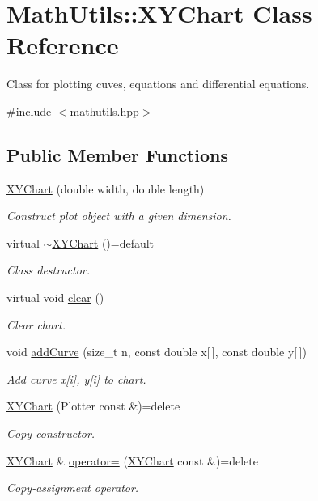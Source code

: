 \hypertarget{classMathUtils_1_1XYChart}{\section{Math\-Utils\-:\-:X\-Y\-Chart Class Reference}
\label{classMathUtils_1_1XYChart}
}


Class for plotting cuves, equations and differential equations.  




{\ttfamily \#include $<$mathutils.\-hpp$>$}

\subsection*{Public Member Functions}
\begin{DoxyCompactItemize}
\item 
\hyperlink{classMathUtils_1_1XYChart_a0ded76c4c566fe0225c58eebf9e012a5}{X\-Y\-Chart} (double width, double length)
\begin{DoxyCompactList}\small\item\em Construct plot object with a given dimension. \end{DoxyCompactList}\item 
virtual \hyperlink{classMathUtils_1_1XYChart_a251e5cd579d0d47948f1d4f76c7e2dd8}{$\sim$\-X\-Y\-Chart} ()=default
\begin{DoxyCompactList}\small\item\em Class destructor. \end{DoxyCompactList}\item 
virtual void \hyperlink{classMathUtils_1_1XYChart_a625ee682427abc4125d2bfa0c0a6f0f0}{clear} ()
\begin{DoxyCompactList}\small\item\em Clear chart. \end{DoxyCompactList}\item 
void \hyperlink{classMathUtils_1_1XYChart_abb639d16a75e6375580e69ccccc2f5ef}{add\-Curve} (size\-\_\-t n, const double x\mbox{[}$\,$\mbox{]}, const double y\mbox{[}$\,$\mbox{]})
\begin{DoxyCompactList}\small\item\em Add curve x\mbox{[}i\mbox{]}, y\mbox{[}i\mbox{]} to chart. \end{DoxyCompactList}\item 
\hyperlink{classMathUtils_1_1XYChart_abe905a2e1909bbe15ded217e73990fb5}{X\-Y\-Chart} (Plotter const \&)=delete
\begin{DoxyCompactList}\small\item\em Copy constructor. \end{DoxyCompactList}\item 
\hyperlink{classMathUtils_1_1XYChart}{X\-Y\-Chart} \& \hyperlink{classMathUtils_1_1XYChart_ae54518383fe46290828165a1f5780f9e}{operator=} (\hyperlink{classMathUtils_1_1XYChart}{X\-Y\-Chart} const \&)=delete
\begin{DoxyCompactList}\small\item\em Copy-\/assignment operator. \end{DoxyCompactList}\end{DoxyCompactItemize}


